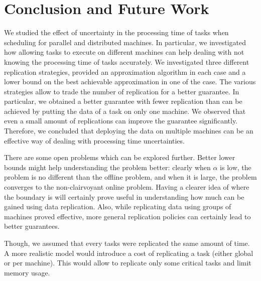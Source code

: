 \documentclass[twocolumn]{svjour3}
\begin{document}
\section{Conclusion and Future Work}\label{sec8}

We studied the effect of uncertainty in the processing time of tasks
when scheduling for parallel and distributed machines. In particular, we
investigated how allowing tasks to execute on different machines can
help dealing with not knowing the processing time of tasks
accurately. We investigated three different replication strategies,
provided an approximation algorithm in each case and a lower bound on the
best achievable approximation in one of the case. The various
strategies allow to trade the number of replication for a better
guarantee. In particular, we obtained a better guarantee with fewer
replication than can be achieved by putting the data of a task on only
one machine. We observed that even a small amount of replications can
improve the guarantee significantly. Therefore, we concluded that
deploying the data on multiple machines can be an effective way of
dealing with processing time uncertainties.

There are some open problems which can be explored further. Better
lower bounds might help understanding the problem better: clearly when
$\alpha$ is low, the problem is no different than the offline problem,
and when it is large, the problem converges to the non-clairvoyant
online problem. Having a clearer idea of where the boundary is will
certainly prove useful in understanding how much can be gained using
data replication. Also, while replicating data using groups of
machines proved effective, more general replication policies can
certainly lead to better guarantees.

Though, we assumed that every tasks were replicated the same amount of
time. A more realistic model would introduce a cost of replicating a
task (either global or per machine). This would allow to replicate
only some critical tasks and limit memory usage.


 
\end{document}
